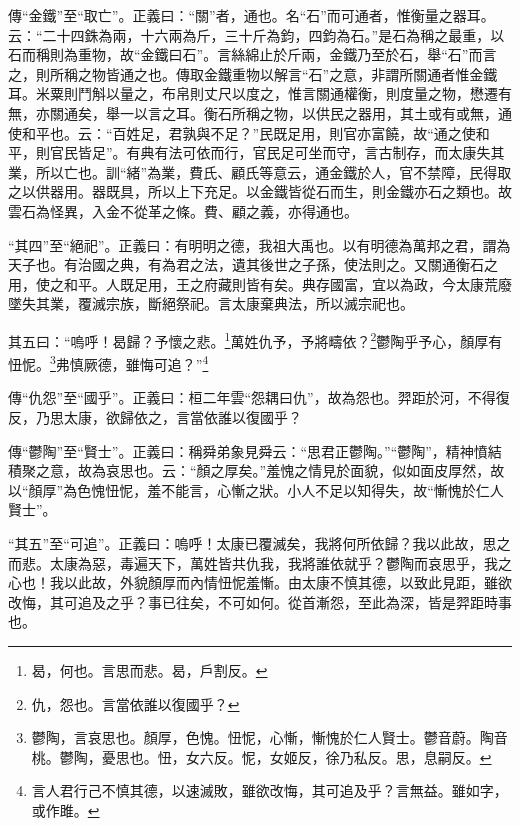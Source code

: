 {\noindent\zhuan{}\fzbyks 傳“金鐵”至“取亡”。正義曰：“關”者，通也。名“石”而可通者，惟衡量之器耳。云：“二十四銖為兩，十六兩為斤，三十斤為鈞，四鈞為石。”是石為稱之最重，以石而稱則為重物，故“金鐵曰石”。言絲綿止於斤兩，金鐵乃至於石，舉“石”而言之，則所稱之物皆通之也。傳取金鐵重物以解言“石”之意，非謂所關通者惟金鐵耳。米粟則鬥斛以量之，布帛則丈尺以度之，惟言關通權衡，則度量之物，懋遷有無，亦關通矣，舉一以言之耳。衡石所稱之物，以供民之器用，其土或有或無，通使和平也。云：“百姓足，君孰與不足？”民既足用，則官亦富饒，故“通之使和平，則官民皆足”。有典有法可依而行，官民足可坐而守，言古制存，而太康失其業，所以亡也。訓“緒”為業，費氏、顧氏等意云，通金鐵於人，官不禁障，民得取之以供器用。器既具，所以上下充足。以金鐵皆從石而生，則金鐵亦石之類也。故雲石為怪異，入金不從革之條。費、顧之義，亦得通也。 \par}

{\noindent\shu{}\fzkt “其四”至“絕祀”。正義曰：有明明之德，我祖大禹也。以有明德為萬邦之君，謂為天子也。有治國之典，有為君之法，遺其後世之子孫，使法則之。又關通衡石之用，使之和平。人既足用，王之府藏則皆有矣。典存國富，宜以為政，今太康荒廢墜失其業，覆滅宗族，斷絕祭祀。言太康棄典法，所以滅宗祀也。 \par}

其五曰：“嗚呼！曷歸？予懷之悲。\footnote{曷，何也。言思而悲。曷，戶割反。}萬姓仇予，予將疇依？\footnote{仇，怨也。言當依誰以復國乎？}鬱陶乎予心，顏厚有忸怩。\footnote{鬱陶，言哀思也。顏厚，色愧。忸怩，心慚，慚愧於仁人賢士。鬱音蔚。陶音桃。鬱陶，憂思也。忸，女六反。怩，女姬反，徐乃私反。思，息嗣反。}弗慎厥德，雖悔可追？”\footnote{言人君行己不慎其德，以速滅敗，雖欲改悔，其可追及乎？言無益。雖如字，或作雎。}


{\noindent\zhuan{}\fzbyks 傳“仇怨”至“國乎”。正義曰：桓二年雲“怨耦曰仇”，故為怨也。羿距於河，不得復反，乃思太康，欲歸依之，言當依誰以復國乎？ \par}

{\noindent\zhuan{}\fzbyks 傳“鬱陶”至“賢士”。正義曰：稱舜弟象見舜云：“思君正鬱陶。”“鬱陶”，精神憤結積聚之意，故為哀思也。云：“顏之厚矣。”羞愧之情見於面貌，似如面皮厚然，故以“顏厚”為色愧忸怩，羞不能言，心慚之狀。小人不足以知得失，故“慚愧於仁人賢士”。 \par}

{\noindent\shu{}\fzkt “其五”至“可追”。正義曰：嗚呼！太康已覆滅矣，我將何所依歸？我以此故，思之而悲。太康為惡，毒遍天下，萬姓皆共仇我，我將誰依就乎？鬱陶而哀思乎，我之心也！我以此故，外貌顏厚而內情忸怩羞慚。由太康不慎其德，以致此見距，雖欲改悔，其可追及之乎？事已往矣，不可如何。從首漸怨，至此為深，皆是羿距時事也。 \par}

